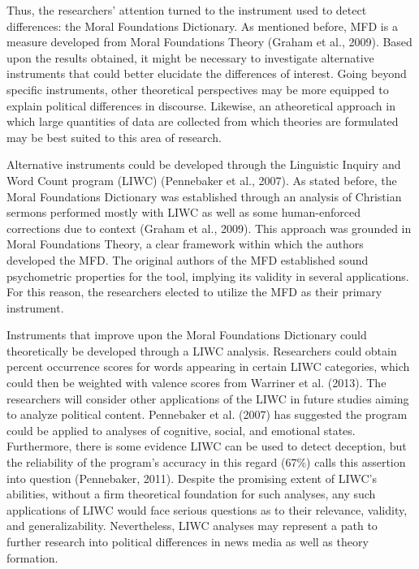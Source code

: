 \documentclass[english,,man]{apa6}
\begin{document}
Thus, the researchers' attention turned to the instrument used to detect
differences: the Moral Foundations Dictionary. As mentioned before, MFD
is a measure developed from Moral Foundations Theory (Graham et al.,
2009). Based upon the results obtained, it might be necessary to
investigate alternative instruments that could better elucidate the
differences of interest. Going beyond specific instruments, other
theoretical perspectives may be more equipped to explain political
differences in discourse. Likewise, an atheoretical approach in which
large quantities of data are collected from which theories are
formulated may be best suited to this area of research.

Alternative instruments could be developed through the Linguistic
Inquiry and Word Count program (LIWC) (Pennebaker et al., 2007). As
stated before, the Moral Foundations Dictionary was established through
an analysis of Christian sermons performed mostly with LIWC as well as
some human-enforced corrections due to context (Graham et al., 2009).
This approach was grounded in Moral Foundations Theory, a clear
framework within which the authors developed the MFD. The original
authors of the MFD established sound psychometric properties for the
tool, implying its validity in several applications. For this reason,
the researchers elected to utilize the MFD as their primary instrument.

Instruments that improve upon the Moral Foundations Dictionary could
theoretically be developed through a LIWC analysis. Researchers could
obtain percent occurrence scores for words appearing in certain LIWC
categories, which could then be weighted with valence scores from
Warriner et al. (2013). The researchers will consider other applications
of the LIWC in future studies aiming to analyze political content.
Pennebaker et al. (2007) has suggested the program could be applied to
analyses of cognitive, social, and emotional states. Furthermore, there
is some evidence LIWC can be used to detect deception, but the
reliability of the program's accuracy in this regard (67\%) calls this
assertion into question (Pennebaker, 2011). Despite the promising extent
of LIWC's abilities, without a firm theoretical foundation for such
analyses, any such applications of LIWC would face serious questions as
to their relevance, validity, and generalizability. Nevertheless, LIWC
analyses may represent a path to further research into political
differences in news media as well as theory formation.
\end{document}
